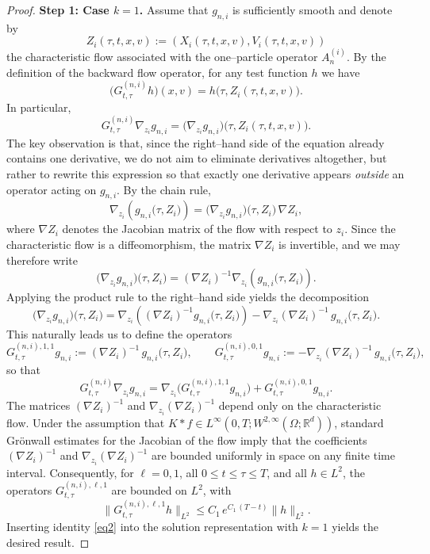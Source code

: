 \documentclass[10pt,a4paper]{amsart}
\begin{document}
\begin{proof}
\medskip
\noindent\textbf{Step 1: Case $k=1$.}
Assume that $g_{n,i}$ is sufficiently smooth and denote by
\[
Z_i(\tau,t,x,v) := (X_i(\tau,t,x,v), V_i(\tau,t,x,v))
\]
the characteristic flow associated with the one--particle operator $A_n^{(i)}$.
By the definition of the backward flow operator, for any test function $h$ we have
\[
\big(G^{(n,i)}_{t,\tau} h\big)(x,v) = h\big(\tau, Z_i(\tau,t,x,v)\big).
\]
In particular,
\[
G^{(n,i)}_{t,\tau}\nabla_{z_i} g_{n,i}
=
\big(\nabla_{z_i} g_{n,i}\big)\big(\tau,Z_i(\tau,t,x,v)\big).
\]
The key observation is that, since the right--hand side of the equation already
contains one derivative, we do not aim to eliminate derivatives altogether, but
rather to rewrite this expression so that exactly one derivative appears
\emph{outside} an operator acting on $g_{n,i}$. By the chain rule,
\[
\nabla_{z_i}\!\left(g_{n,i}\big(\tau,Z_i\big)\right)
=
\big(\nabla_{z_i} g_{n,i}\big)\big(\tau,Z_i\big)\,\nabla Z_i,
\]
where $\nabla Z_i$ denotes the Jacobian matrix of the flow with respect to $z_i$.
Since the characteristic flow is a diffeomorphism, the matrix $\nabla Z_i$ is
invertible, and we may therefore write
\[
\big(\nabla_{z_i} g_{n,i}\big)\big(\tau,Z_i\big)
=
(\nabla Z_i)^{-1}
\nabla_{z_i}\!\left(g_{n,i}\big(\tau,Z_i\big)\right).
\]
Applying the product rule to the right--hand side yields the decomposition
\[
\big(\nabla_{z_i} g_{n,i}\big)\big(\tau,Z_i\big)
=
\nabla_{z_i}\!\left((\nabla Z_i)^{-1} g_{n,i}\big(\tau,Z_i\big)\right)
-
\nabla_{z_i}(\nabla Z_i)^{-1}\,
g_{n,i}\big(\tau,Z_i\big).
\]
This naturally leads us to define the operators
\[
G^{(n,i),1,1}_{t,\tau} g_{n,i}
:=
(\nabla Z_i)^{-1}\, g_{n,i}\big(\tau,Z_i\big),
\qquad
G^{(n,i),0,1}_{t,\tau} g_{n,i}
:=
-\nabla_{z_i}(\nabla Z_i)^{-1}\, g_{n,i}\big(\tau,Z_i\big),
\]
so that
\begin{equation}\label{eq2}
G^{(n,i)}_{t,\tau}\nabla_{z_i} g_{n,i}
=
\nabla_{z_i}\big(G^{(n,i),1,1}_{t,\tau} g_{n,i}\big)
+
G^{(n,i),0,1}_{t,\tau} g_{n,i}.
\end{equation}
The matrices $(\nabla Z_i)^{-1}$ and $\nabla_{z_i}(\nabla Z_i)^{-1}$ depend only on
the characteristic flow. Under the assumption that $K*f \in L^{\infty}(0,T;W^{2,\infty}(\Omega;\mathbb{R}^d))$, standard Gr\"onwall estimates for the
Jacobian of the flow imply that the coefficients $(\nabla Z_i)^{-1}$ and
$\nabla_{z_i}(\nabla Z_i)^{-1}$ are bounded uniformly in space on any finite time
interval. Consequently, for $\ell=0,1$, all $0\le t\le \tau\le T$, and all $h \in L^2$, the operators
$G^{(n,i),\ell,1}_{t,\tau}$ are bounded on $L^2$, with
\[
\|G^{(n,i),\ell,1}_{t,\tau} h\|_{L^2}
\le C_1\,e^{C_1\,(T-t)}\|h \|_{L^2}.
\]
Inserting identity \eqref{eq2} into the solution representation with $k=1$
yields the desired result.


\end{proof}
\end{document}
